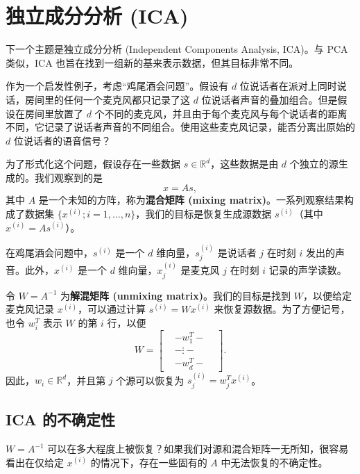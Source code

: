 \chapter{独立成分分析 (ICA)}

下一个主题是独立成分分析 (Independent Components Analysis, ICA)。与 PCA 类似，ICA 也旨在找到一组新的基来表示数据，但其目标非常不同。

作为一个启发性例子，考虑“鸡尾酒会问题”。假设有 $d$ 位说话者在派对上同时说话，房间里的任何一个麦克风都只记录了这 $d$ 位说话者声音的叠加组合。但是假设在房间里放置了 $d$ 个不同的麦克风，并且由于每个麦克风与每个说话者的距离不同，它记录了说话者声音的不同组合。使用这些麦克风记录，能否分离出原始的 $d$ 位说话者的语音信号？

为了形式化这个问题，假设存在一些数据 $s \in \mathbb{R}^d$，这些数据是由 $d$ 个独立的源生成的。我们观察到的是
\[
    x = As,
\]
其中 $A$ 是一个未知的方阵，称为\textbf{混合矩阵 (mixing matrix)}。一系列观察结果构成了数据集 $\{x^{(i)}; i = 1, \dots, n\}$，我们的目标是恢复生成源数据 $s^{(i)}$（其中 $x^{(i)} = As^{(i)}$）。

在鸡尾酒会问题中，$s^{(i)}$ 是一个 $d$ 维向量，$s_j^{(i)}$ 是说话者 $j$ 在时刻 $i$ 发出的声音。此外，$x^{(i)}$ 是一个 $d$ 维向量，$x_j^{(i)}$ 是麦克风 $j$ 在时刻 $i$ 记录的声学读数。

令 $W = A^{-1}$ 为\textbf{解混矩阵 (unmixing matrix)}。我们的目标是找到 $W$，以便给定麦克风记录 $x^{(i)}$，可以通过计算 $s^{(i)} = W x^{(i)}$ 来恢复源数据。为了方便记号，也令 $w_i^T$ 表示 $W$ 的第 $i$ 行，以便
\[
    W = 
    \begin{bmatrix} 
        & -w_1^T- & \\
        & -\vdots- & \\
        & -w_d^T- & 
    \end{bmatrix}.
\]
因此，$w_i \in \mathbb{R}^d$，并且第 $j$ 个源可以恢复为 $s_j^{(i)} = w_j^T x^{(i)}$。

\section{ICA 的不确定性}

$W=A^{-1}$ 可以在多大程度上被恢复？如果我们对源和混合矩阵一无所知，很容易看出在仅给定 $x^{(i)}$ 的情况下，存在一些固有的 $A$ 中无法恢复的不确定性。

